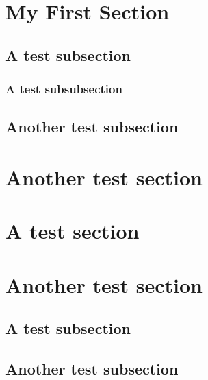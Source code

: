 \documentclass[titlepage]{article} %
\newcommand*\rbreak{\par\noindent\linebreak} %
\begin{document}

\tableofcontents
\clearpage

\section{My First Section}
	\blindtext
	\subsection{A test subsection}
		\blindtext
		\subsubsection{A test subsubsection}
			\blindtext \rbreak 
			\blindtext \rbreak
			\blindtext
		\subsection{Another test subsection}
			\blindtext
	\section{Another test section}
		\blindtext
	\section{A test section}
		\blindtext
	\section{Another test section}
		\blindtext
		\subsection{A test subsection}
			\blindtext
		\subsection{Another test subsection}
			\blindtext
\end{document}
